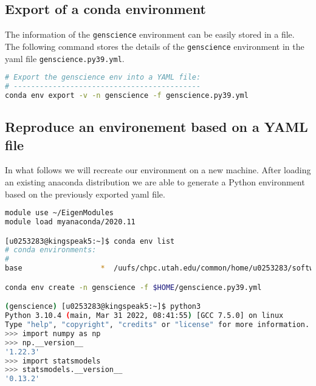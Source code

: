 \documentclass[10pt]{article}
\begin{document}
\subsection{Export of a conda environment}
The information of the \texttt{genscience} environment can be easily stored in a file.
The following command stores the details of the \texttt{genscience} environment in the 
yaml file \texttt{genscience.py39.yml}.

\begin{lstlisting}[language=bash]
# Export the genscience env into a YAML file:
# -------------------------------------------
conda env export -v -n genscience -f genscience.py39.yml
\end{lstlisting}

\subsection{Reproduce an environement based on a YAML file}
In what follows we will recreate our environment on a new machine.
After loading an existing anaconda distribution we are able to generate a
Python environment based on the previously exported yaml file.

\begin{lstlisting}[language=bash]
module use ~/EigenModules
module load myanaconda/2020.11

[u0253283@kingspeak5:~]$ conda env list
# conda environments:
#
base                  *  /uufs/chpc.utah.edu/common/home/u0253283/software/pkg/anaconda3/2020.11

conda env create -n genscience -f $HOME/genscience.py39.yml

(genscience) [u0253283@kingspeak5:~]$ python3
Python 3.10.4 (main, Mar 31 2022, 08:41:55) [GCC 7.5.0] on linux
Type "help", "copyright", "credits" or "license" for more information.
>>> import numpy as np
>>> np.__version__
'1.22.3'
>>> import statsmodels
>>> statsmodels.__version__
'0.13.2'

\end{lstlisting}




\end{document}

